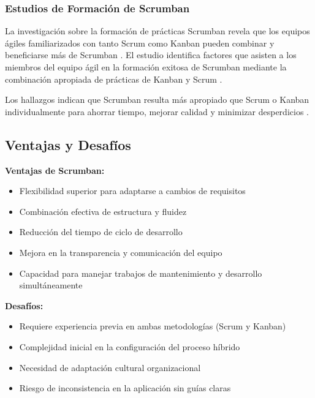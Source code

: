 \documentclass[conference]{IEEEtran}
\begin{document}
\subsubsection{Estudios de Formación de Scrumban}

La investigación sobre la formación de prácticas Scrumban revela que los equipos ágiles familiarizados con tanto Scrum como Kanban pueden combinar y beneficiarse más de Scrumban \cite{empirical_scrumban_formation}. El estudio identifica factores que asisten a los miembros del equipo ágil en la formación exitosa de Scrumban mediante la combinación apropiada de prácticas de Kanban y Scrum \cite{empirical_scrumban_2018}.

Los hallazgos indican que Scrumban resulta más apropiado que Scrum o Kanban individualmente para ahorrar tiempo, mejorar calidad y minimizar desperdicios \cite{empirical_scrumban_2018}.

\subsection{Ventajas y Desafíos}

\textbf{Ventajas de Scrumban:}
\begin{itemize}
\item Flexibilidad superior para adaptarse a cambios de requisitos \cite{sixsigma_scrumban}
\item Combinación efectiva de estructura y fluidez \cite{atlassian_scrumban}
\item Reducción del tiempo de ciclo de desarrollo \cite{agile_marketing_examples}
\item Mejora en la transparencia y comunicación del equipo \cite{yilmaz_gamification_2016}
\item Capacidad para manejar trabajos de mantenimiento y desarrollo simultáneamente \cite{scrumbanfall_2020}
\end{itemize}

\textbf{Desafíos:}
\begin{itemize}
\item Requiere experiencia previa en ambas metodologías (Scrum y Kanban) \cite{empirical_scrumban_2018}
\item Complejidad inicial en la configuración del proceso híbrido \cite{scrumban_integration_2020}
\item Necesidad de adaptación cultural organizacional \cite{yilmaz_gamification_2016}
\item Riesgo de inconsistencia en la aplicación sin guías claras \cite{scrumbanfall_2020}
\end{itemize}
\end{document}
